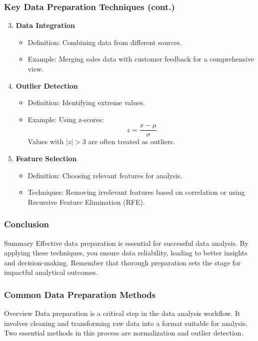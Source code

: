 \documentclass[aspectratio=169]{beamer}
\begin{document}
\begin{frame}[fragile]
    \frametitle{Key Data Preparation Techniques (cont.)}
    \begin{enumerate}
        \setcounter{enumi}{2}
        \item \textbf{Data Integration}
        \begin{itemize}
            \item Definition: Combining data from different sources.
            \item Example: Merging sales data with customer feedback for a comprehensive view.
        \end{itemize}

        \item \textbf{Outlier Detection}
        \begin{itemize}
            \item Definition: Identifying extreme values.
            \item Example: Using z-scores:
            \begin{equation}
            z = \frac{x - \mu}{\sigma}
            \end{equation}
            Values with $|z| > 3$ are often treated as outliers.
        \end{itemize}
        
        \item \textbf{Feature Selection}
        \begin{itemize}
            \item Definition: Choosing relevant features for analysis.
            \item Techniques: Removing irrelevant features based on correlation or using Recursive Feature Elimination (RFE).
        \end{itemize}
    \end{enumerate}
\end{frame}

\begin{frame}[fragile]
    \frametitle{Conclusion}
    \begin{block}{Summary}
        Effective data preparation is essential for successful data analysis. By applying these techniques, you ensure data reliability, leading to better insights and decision-making. Remember that thorough preparation sets the stage for impactful analytical outcomes.
    \end{block}
\end{frame}

\begin{frame}[fragile]
    \frametitle{Common Data Preparation Methods}
    \begin{block}{Overview}
        Data preparation is a critical step in the data analysis workflow. It involves cleaning and transforming raw data into a format suitable for analysis. Two essential methods in this process are normalization and outlier detection.
    \end{block}
\end{frame}
\end{document}
